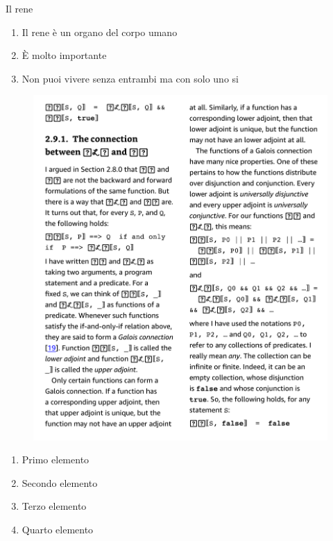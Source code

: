 \documentclass{beamer}
\begin{document}
\begin{frame}{Il rene}
    \begin{enumerate}
        \item Il rene è un organo del corpo umano
        \item È molto importante
        \item Non puoi vivere senza entrambi ma con solo uno si
    \end{enumerate}
    \begin{figure}
        \includegraphics[scale=0.4]{./assets/images/Screenshot 2023-06-01 at 14.25.40.png}
    \end{figure}
\end{frame}

\begin{frame}
    \begin{enumerate}
         \item Primo elemento
         \item Secondo elemento
          \item Terzo elemento
          \item Quarto elemento
    \end{enumerate}
\end{frame}
\end{document}
